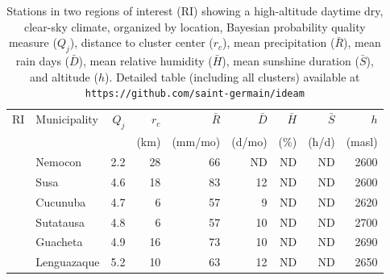 \documentclass[12pt]{iopart}
\begin{document}
\begin{table}
\caption{\label{tabfin}Stations in two regions of interest (RI) showing a high-altitude daytime dry, clear-sky climate, organized by location, Bayesian probability quality measure ($Q_j$), distance to cluster center ($r_c$), mean precipitation  ($\bar{R}$), mean rain days ($\bar{D}$), mean relative humidity  ($\bar{H}$), mean sunshine duration  ($\bar{S}$), and altitude ($h$). Detailed table (including all clusters) available at \texttt{https://github.com/saint-germain/ideam} \\}

\begin{tabular}{clrrrrrrr}
\toprule
RI&                   Municipality  &  $Q_j$ &  $r_c$  &   $\bar{R}$ &   $\bar{D}$  &   $\bar{H}$  &  $\bar{S}$ &  $h$ \\
 &                   &    &    (km) &   (mm/mo) &  (d/mo) &   (\%) &   (h/d) &  (masl) \\
\midrule
            &                       Nemocon &            2.2 &                        28 &                        66 &                   ND &                        ND &                          ND &    2600 \\
            &                          Susa &            4.6 &                        18 &                        83 &                   12 &                        ND &                          ND &    2600 \\
            &                      Cucunuba &            4.7 &                         6 &                        57 &                    9 &                        ND &                          ND &    2620 \\
            &                     Sutatausa &            4.8 &                         6 &                        57 &                   10 &                        ND &                          ND &    2700 \\
            &                      Guacheta &            4.9 &                        16 &                        73 &                   10 &                        ND &                          ND &    2690 \\
            &                   Lenguazaque &            5.2 &                        10 &                        63 &                   12 &                        ND &                          ND &    2650 \\

\end{tabular}
\end{table}
\end{document}
